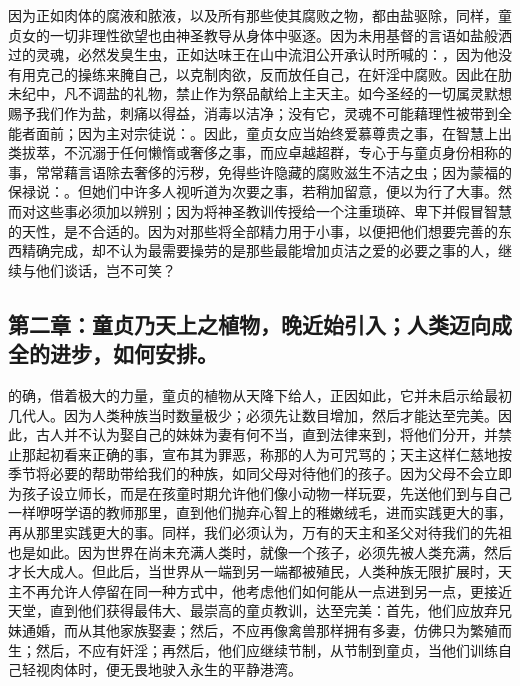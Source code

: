 因为正如肉体的腐液和脓液，以及所有那些使其腐败之物，都由盐驱除，同样，童贞女的一切非理性欲望也由神圣教导从身体中驱逐。因为未用基督的言语如盐般洒过的灵魂，必然发臭生虫，正如达味王在山中流泪公开承认时所喊的：，因为他没有用克己的操练来腌自己，以克制肉欲，反而放任自己，在奸淫中腐败。因此在肋未纪中，凡不调盐的礼物，禁止作为祭品献给上主天主。如今圣经的一切属灵默想赐予我们作为盐，刺痛以得益，消毒以洁净；没有它，灵魂不可能藉理性被带到全能者面前；因为主对宗徒说：。因此，童贞女应当始终爱慕尊贵之事，在智慧上出类拔萃，不沉溺于任何懒惰或奢侈之事，而应卓越超群，专心于与童贞身份相称的事，常常藉言语除去奢侈的污秽，免得些许隐藏的腐败滋生不洁之虫；因为蒙福的保禄说：。但她们中许多人视听道为次要之事，若稍加留意，便以为行了大事。然而对这些事必须加以辨别；因为将神圣教训传授给一个注重琐碎、卑下并假冒智慧的天性，是不合适的。因为对那些将全部精力用于小事，以便把他们想要完善的东西精确完成，却不认为最需要操劳的是那些最能增加贞洁之爱的必要之事的人，继续与他们谈话，岂不可笑？\par


\subsection{第二章：童贞乃天上之植物，晚近始引入；人类迈向成全的进步，如何安排。}

的确，借着极大的力量，童贞的植物从天降下给人，正因如此，它并未启示给最初几代人。因为人类种族当时数量极少；必须先让数目增加，然后才能达至完美。因此，古人并不认为娶自己的妹妹为妻有何不当，直到法律来到，将他们分开，并禁止那起初看来正确的事，宣布其为罪恶，称那的人为可咒骂的；天主这样仁慈地按季节将必要的帮助带给我们的种族，如同父母对待他们的孩子。因为父母不会立即为孩子设立师长，而是在孩童时期允许他们像小动物一样玩耍，先送他们到与自己一样咿呀学语的教师那里，直到他们抛弃心智上的稚嫩绒毛，进而实践更大的事，再从那里实践更大的事。同样，我们必须认为，万有的天主和圣父对待我们的先祖也是如此。因为世界在尚未充满人类时，就像一个孩子，必须先被人类充满，然后才长大成人。但此后，当世界从一端到另一端都被殖民，人类种族无限扩展时，天主不再允许人停留在同一种方式中，他考虑他们如何能从一点进到另一点，更接近天堂，直到他们获得最伟大、最崇高的童贞教训，达至完美：首先，他们应放弃兄妹通婚，而从其他家族娶妻；然后，不应再像禽兽那样拥有多妻，仿佛只为繁殖而生；然后，不应有奸淫；再然后，他们应继续节制，从节制到童贞，当他们训练自己轻视肉体时，便无畏地驶入永生的平静港湾。\par

